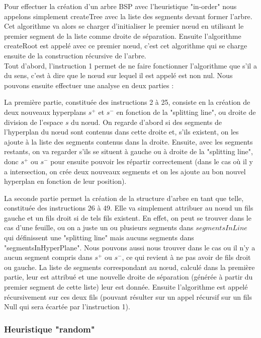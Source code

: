 \documentclass[11pt,a4paper]{article}
\theoremstyle{definition}
\theoremstyle{remark}
\begin{document}
Pour effectuer la création d'un arbre BSP avec l'heuristique "in-order" nous appelons simplement createTree avec la liste des segments devant former l'arbre. Cet algorithme va alors se charger d'initialiser le premier nœud en utilisant le premier segment de la liste comme droite de séparation. Ensuite l'algorithme createRoot est appelé avec ce premier nœud, c'est cet algorithme qui se charge ensuite de la construction récursive de l'arbre. \\

Tout d'abord, l'instruction 1 permet de ne faire fonctionner l'algorithme que s'il a du sens, c'est à dire que le nœud sur lequel il est appelé est non nul. Nous pouvons ensuite effectuer une analyse en deux parties : 

La première partie, constituée des instructions 2 à 25, consiste en la création de deux nouveaux hyperplans $s^+$ et $s^-$ en fonction de la "splitting line", ou droite de division de l'espace $s$ du nœud. On regarde d'abord si des segments de l'hyperplan du nœud sont contenus dans cette droite et, s'ils existent, on les ajoute à la liste des segments contenus dans la droite. Ensuite, avec les segments restants, on va regarder s'ils se situent à gauche ou à droite de la "splitting line", donc $s^+$ ou $s^-$ pour ensuite pouvoir les répartir correctement (dans le cas où il y a intersection, on crée deux nouveaux segments et on les ajoute au bon nouvel hyperplan en fonction de leur position). 

La seconde partie permet la création de la structure d'arbre en tant que telle, constituée des instructions 26 à 49. Elle va simplement attribuer au nœud un fils gauche et un fils droit si de tels fils existent. En effet, on peut se trouver dans le cas d'une feuille, ou on a juste un ou plusieurs segments dans $segmentsInLine$ qui définissent une "splitting line" mais aucuns segments dans "segmentsInHyperPlane". Nous pouvons aussi nous trouver dans le cas ou il n'y a aucun segment compris dans $s^+$ ou $s^-$, ce qui revient à ne pas avoir de fils droit ou gauche. La liste de segments correspondant au nœud, calculé dans la première partie, leur est attribué et une nouvelle droite de séparation (générée à partir du premier segment de cette liste) leur est donnée. Ensuite l'algorithme est appelé récursivement sur ces deux fils (pouvant résulter sur un appel récursif sur un fils Null qui sera écartée par l'instruction 1). 

\subsubsection{Heuristique "random"}
\end{document}
